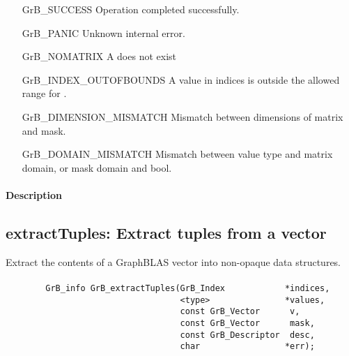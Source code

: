 \begin{itemize}[leftmargin=2.1in]
    \item[{\sf GrB\_SUCCESS}]     Operation completed successfully.
    \item[{\sf GrB\_PANIC}]            Unknown internal error.
    \item[{\sf GrB\_NOMATRIX}]      {\sf A} does not exist
    \item[{\sf GrB\_INDEX\_OUTOFBOUNDS}]
                       A value in {\sf indices} is outside the allowed range for .
    \item[\sf GrB\_DIMENSION\_MISMATCH]  
                       Mismatch between dimensions of matrix and mask. 
    \item[\sf GrB\_DOMAIN\_MISMATCH]  
                       Mismatch between value type and matrix domain, or mask domain and {\sf bool}.
\end{itemize}

\paragraph{Description}



\subsection{{\sf extractTuples}: Extract tuples from a vector}
\label{Sec:extractTuples}

Extract the contents of a GraphBLAS vector into non-opaque data structures.

\paragraph{\syntax}

\begin{verbatim}
        GrB_info GrB_extractTuples(GrB_Index            *indices,
                                   <type>               *values, 
                                   const GrB_Vector      v,
                                   const GrB_Vector      mask,
                                   const GrB_Descriptor  desc,
                                   char                 *err);

\end{verbatim}

